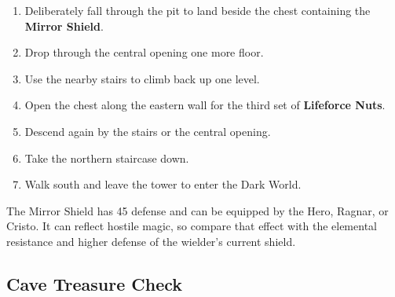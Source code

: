 \documentclass[
  american,
  10pt,
  letterpaper,
  oneside,
  open=any]{scrreprt}
\providecommand{\tightlist}{%
  \setlength{\itemsep}{0pt}\setlength{\parskip}{0pt}}
\begin{document}
\begin{enumerate}
\def\labelenumi{\arabic{enumi}.}
\tightlist
\item
  Deliberately fall through the pit to land beside the chest containing
  the \textbf{Mirror Shield}.
\item
  Drop through the central opening one more floor.
\item
  Use the nearby stairs to climb back up one level.
\item
  Open the chest along the eastern wall for the third set of
  \textbf{Lifeforce Nuts}.
\item
  Descend again by the stairs or the central opening.
\item
  Take the northern staircase down.
\item
  Walk south and leave the tower to enter the Dark World.
\end{enumerate}

The Mirror Shield has 45 defense and can be equipped by the Hero,
Ragnar, or Cristo. It can reflect hostile magic, so compare that effect
with the elemental resistance and higher defense of the wielder's
current shield.

\subsection{Cave Treasure Check}\label{cave-treasure-check}
\end{document}
